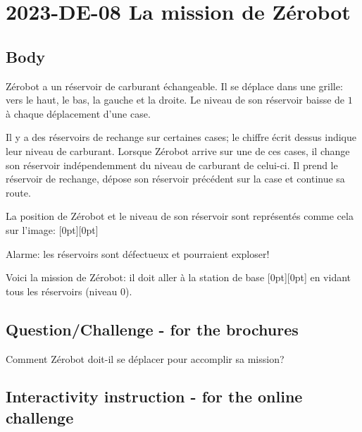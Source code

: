 \documentclass[a4paper,11pt]{report}
\newcommand{\taskGraphicsFolder}{..}
\begin{document}
\section*{\centering{} 2023-DE-08 La mission de Zérobot}


\subsection*{Body}

Zérobot a un réservoir de carburant échangeable. Il se déplace dans une grille: vers le haut, le bas, la gauche et la droite. Le niveau de son réservoir baisse de $1$ à chaque déplacement d’une case.

Il y a des réservoirs de rechange sur certaines cases; le chiffre écrit dessus indique leur niveau de carburant. Lorsque Zérobot arrive sur une de ces cases, il change son réservoir indépendemment du niveau de carburant de celui-ci. Il prend le réservoir de rechange, dépose son réservoir précédent sur la case et continue sa route.

La position de Zérobot et le niveau de son réservoir sont représentés comme cela sur l’image: \raisebox{-0.5ex}[0pt][0pt]{}

{\centering%
\par}

Alarme: les réservoirs sont défectueux et pourraient exploser!

Voici la mission de Zérobot: il doit aller à la station de base \raisebox{-0.5ex}[0pt][0pt]{} en vidant tous les réservoirs (niveau $0$).

{\em


\subsection*{Question/Challenge - for the brochures}

Comment Zérobot doit-il se déplacer pour accomplir sa mission?

}


\subsection*{Interactivity instruction - for the online challenge}
\end{document}
